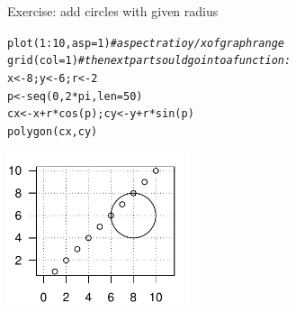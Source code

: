 \documentclass[xcolor=table,      handout ,    xcolor=dvipsnames]{beamer}\usepackage[]{graphicx}\usepackage[]{color}
\makeatletter
\newcommand{\hlnum}[1]{\textcolor[rgb]{0,0,0}{#1}}
\newcommand{\hlcom}[1]{\textcolor[rgb]{0,0.392,0}{\textit{#1}}}
\newcommand{\hlopt}[1]{\textcolor[rgb]{0,0,0}{#1}}
\newcommand{\hlstd}[1]{\textcolor[rgb]{0,0,0}{#1}}
\newcommand{\hlkwb}[1]{\textcolor[rgb]{0,0,0}{#1}}
\newcommand{\hlkwc}[1]{\textcolor[rgb]{1,0,1}{#1}}
\newcommand{\hlkwd}[1]{\textcolor[rgb]{0,0,1}{#1}}
\newenvironment{kframe}{%
 \def\at@end@of@kframe{}%
 \ifinner\ifhmode%
  \def\at@end@of@kframe{\end{minipage}}%
  \begin{minipage}{\columnwidth}%
 \fi\fi%
 \def\FrameCommand##1{\hskip\@totalleftmargin \hskip-\fboxsep
 \colorbox{shadecolor}{##1}\hskip-\fboxsep
     \hskip-\linewidth \hskip-\@totalleftmargin \hskip\columnwidth}%
 \MakeFramed {\advance\hsize-\width
   \@totalleftmargin\z@ \linewidth\hsize
   \@setminipage}}%
 {\par\unskip\endMakeFramed%
 \at@end@of@kframe}
\newenvironment{knitrout}{}{} %
\makeatother
\begin{document}

\begin{frame}[fragile]{Exercise: add circles with given radius}
\begin{knitrout}
\color{fgcolor}\begin{kframe}
\begin{alltt}
\hlkwd{plot}\hlstd{(}\hlnum{1}\hlopt{:}\hlnum{10}\hlstd{,} \hlkwc{asp}\hlstd{=}\hlnum{1}\hlstd{)} \hlcom{# aspect ratio y/x of graph range}
\hlkwd{grid}\hlstd{(}\hlkwc{col}\hlstd{=}\hlnum{1}\hlstd{)} \hlcom{# the next part sould go into a function:}
\hlstd{x} \hlkwb{<-} \hlnum{8} \hlstd{;  y} \hlkwb{<-} \hlnum{6} \hlstd{;  r} \hlkwb{<-}\hlnum{2}
\hlstd{p} \hlkwb{<-} \hlkwd{seq}\hlstd{(}\hlnum{0}\hlstd{,} \hlnum{2}\hlopt{*}\hlstd{pi,} \hlkwc{len}\hlstd{=}\hlnum{50}\hlstd{)}
\hlstd{cx} \hlkwb{<-} \hlstd{x}\hlopt{+}\hlstd{r}\hlopt{*}\hlkwd{cos}\hlstd{(p) ;  cy} \hlkwb{<-} \hlstd{y}\hlopt{+}\hlstd{r}\hlopt{*}\hlkwd{sin}\hlstd{(p)}
\hlkwd{polygon}\hlstd{(cx, cy)}
\end{alltt}
\end{kframe}

{\centering \includegraphics[width=0.4\textwidth]{./fig/circlebasics-1} 

}



\end{knitrout}
\end{frame}

\end{document}
